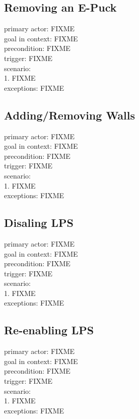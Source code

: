 \documentclass[a4paper,parskip,headheight=38pt]{scrartcl} %
\begin{document}
\subsection{Removing an E-Puck}
primary actor: FIXME \\
goal in context: FIXME \\
precondition: FIXME \\
trigger: FIXME \\
scenario: \\
1. FIXME \\
exceptions: FIXME \\

\subsection{Adding/Removing Walls}
primary actor: FIXME \\
goal in context: FIXME \\
precondition: FIXME \\
trigger: FIXME \\
scenario: \\
1. FIXME \\
exceptions: FIXME \\

\subsection{Disaling LPS}
primary actor: FIXME \\
goal in context: FIXME \\
precondition: FIXME \\
trigger: FIXME \\
scenario: \\
1. FIXME \\
exceptions: FIXME \\

\subsection{Re-enabling LPS}
primary actor: FIXME \\
goal in context: FIXME \\
precondition: FIXME \\
trigger: FIXME \\
scenario: \\
1. FIXME \\
exceptions: FIXME \\
\end{document}
